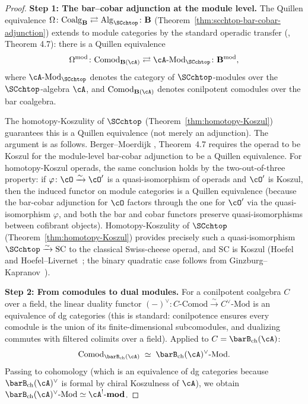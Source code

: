 \begin{proof}
\textbf{Step 1: The bar--cobar adjunction at the module level.}
The Quillen equivalence
$\Omega\colon\mathrm{Coalg}_{\mathbf{B}}
\rightleftarrows
\mathrm{Alg}_{\SCchtop}\colon\mathbf{B}$
(Theorem~\ref{thm:scchtop-bar-cobar-adjunction}) extends to module
categories by the standard operadic transfer
(\cite{BM03}, Theorem 4.7): there is a Quillen
equivalence
\begin{equation}
\Omega^{\mathrm{mod}}\colon
\mathrm{Comod}_{\mathbf{B}(\cA)}
\rightleftarrows
\cA\text{-}\mathrm{Mod}_{\SCchtop}
\colon\mathbf{B}^{\mathrm{mod}},
\end{equation}
where $\cA\text{-}\mathrm{Mod}_{\SCchtop}$ denotes the
category of $\SCchtop$-modules over the $\SCchtop$-algebra
$\cA$, and $\mathrm{Comod}_{\mathbf{B}(\cA)}$ denotes
conilpotent comodules over the bar coalgebra.

The homotopy-Koszulity of $\SCchtop$
(Theorem~\ref{thm:homotopy-Koszul}) guarantees this is a
Quillen equivalence (not merely an adjunction). The
argument is as follows. Berger--Moerdijk \cite{BM03},
Theorem~4.7 requires the operad to be Koszul for the
module-level bar-cobar adjunction to be a Quillen
equivalence. For homotopy-Koszul operads, the same
conclusion holds by the two-out-of-three property: if
$\varphi\colon\cO\xrightarrow{\sim}\cO'$ is a
quasi-isomorphism of operads and $\cO'$ is Koszul,
then the induced functor on module categories is a
Quillen equivalence (because the bar-cobar adjunction
for $\cO$ factors through the one for $\cO'$ via the
quasi-isomorphism $\varphi$, and both the bar and cobar
functors preserve quasi-isomorphisms between cofibrant
objects). Homotopy-Koszulity of $\SCchtop$
(Theorem~\ref{thm:homotopy-Koszul}) provides precisely
such a quasi-isomorphism
$\SCchtop\xrightarrow{\sim}\mathrm{SC}$ to the
classical Swiss-cheese operad, and $\mathrm{SC}$ is
Koszul (Hoefel and Hoefel--Livernet~\cite{Hoe09,HL12}; the binary quadratic
case follows from Ginzburg--Kapranov~\cite{GK94}).

\textbf{Step 2: From comodules to dual modules.}
For a conilpotent coalgebra $C$ over a field, the
linear duality functor $(-)^\vee\colon C\text{-Comod}
\xrightarrow{\sim}C^\vee\text{-Mod}$ is an equivalence of
dg categories (this is standard: conilpotence ensures every
comodule is the union of its finite-dimensional subcomodules,
and dualizing commutes with filtered colimits over a field).
Applied to $C=\barB_{\mathrm{ch}}(\cA)$:
\[
\mathrm{Comod}_{\barB_{\mathrm{ch}}(\cA)}
\;\simeq\;
\barB_{\mathrm{ch}}(\cA)^\vee\text{-Mod}.
\]
Passing to cohomology (which is an equivalence of dg
categories because $\barB_{\mathrm{ch}}(\cA)^\vee$ is
formal by chiral Koszulness of $\cA$), we obtain
$\barB_{\mathrm{ch}}(\cA)^\vee\text{-Mod}
\simeq\cA^!\text{-}\mathbf{mod}$.


\end{proof}

